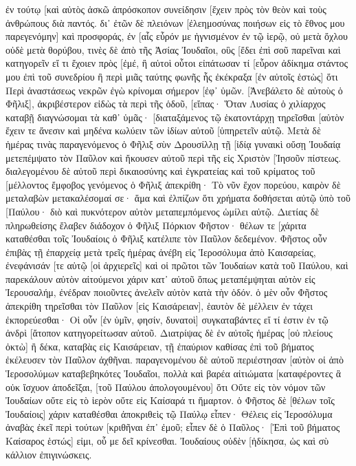 ἐν τούτῳ [καὶ αὐτὸς ἀσκῶ ἀπρόσκοπον συνείδησιν [ἔχειν πρὸς τὸν θεὸν καὶ τοὺς ἀνθρώπους διὰ παντός. 
δι᾽ ἐτῶν δὲ πλειόνων [ἐλεημοσύνας ποιήσων εἰς τὸ ἔθνος μου παρεγενόμην] καὶ προσφοράς, 
ἐν [αἷς εὗρόν με ἡγνισμένον ἐν τῷ ἱερῷ, οὐ μετὰ ὄχλου οὐδὲ μετὰ θορύβου, 
τινὲς δὲ ἀπὸ τῆς Ἀσίας Ἰουδαῖοι, οὓς [ἔδει ἐπὶ σοῦ παρεῖναι καὶ κατηγορεῖν εἴ τι ἔχοιεν πρὸς [ἐμέ, 
ἢ αὐτοὶ οὗτοι εἰπάτωσαν τί [εὗρον ἀδίκημα στάντος μου ἐπὶ τοῦ συνεδρίου 
ἢ περὶ μιᾶς ταύτης φωνῆς ἧς ἐκέκραξα [ἐν αὐτοῖς ἑστὼς] ὅτι Περὶ ἀναστάσεως νεκρῶν ἐγὼ κρίνομαι σήμερον [ἐφ᾽ ὑμῶν. 
[Ἀνεβάλετο δὲ αὐτοὺς ὁ Φῆλιξ], ἀκριβέστερον εἰδὼς τὰ περὶ τῆς ὁδοῦ, [εἴπας· Ὅταν Λυσίας ὁ χιλίαρχος καταβῇ διαγνώσομαι τὰ καθ᾽ ὑμᾶς· 
[διαταξάμενος τῷ ἑκατοντάρχῃ τηρεῖσθαι [αὐτὸν ἔχειν τε ἄνεσιν καὶ μηδένα κωλύειν τῶν ἰδίων αὐτοῦ [ὑπηρετεῖν αὐτῷ. 
Μετὰ δὲ ἡμέρας τινὰς παραγενόμενος ὁ Φῆλιξ σὺν Δρουσίλλῃ τῇ [ἰδίᾳ γυναικὶ οὔσῃ Ἰουδαίᾳ μετεπέμψατο τὸν Παῦλον καὶ ἤκουσεν αὐτοῦ περὶ τῆς εἰς Χριστὸν [Ἰησοῦν πίστεως. 
διαλεγομένου δὲ αὐτοῦ περὶ δικαιοσύνης καὶ ἐγκρατείας καὶ τοῦ κρίματος τοῦ [μέλλοντος ἔμφοβος γενόμενος ὁ Φῆλιξ ἀπεκρίθη· Τὸ νῦν ἔχον πορεύου, καιρὸν δὲ μεταλαβὼν μετακαλέσομαί σε· 
ἅμα καὶ ἐλπίζων ὅτι χρήματα δοθήσεται αὐτῷ ὑπὸ τοῦ [Παύλου· διὸ καὶ πυκνότερον αὐτὸν μεταπεμπόμενος ὡμίλει αὐτῷ. 
Διετίας δὲ πληρωθείσης ἔλαβεν διάδοχον ὁ Φῆλιξ Πόρκιον Φῆστον· θέλων τε [χάριτα καταθέσθαι τοῖς Ἰουδαίοις ὁ Φῆλιξ κατέλιπε τὸν Παῦλον δεδεμένον. 
Φῆστος οὖν ἐπιβὰς τῇ ἐπαρχείᾳ μετὰ τρεῖς ἡμέρας ἀνέβη εἰς Ἱεροσόλυμα ἀπὸ Καισαρείας, 
ἐνεφάνισάν [τε αὐτῷ [οἱ ἀρχιερεῖς] καὶ οἱ πρῶτοι τῶν Ἰουδαίων κατὰ τοῦ Παύλου, καὶ παρεκάλουν αὐτὸν 
αἰτούμενοι χάριν κατ᾽ αὐτοῦ ὅπως μεταπέμψηται αὐτὸν εἰς Ἰερουσαλήμ, ἐνέδραν ποιοῦντες ἀνελεῖν αὐτὸν κατὰ τὴν ὁδόν. 
ὁ μὲν οὖν Φῆστος ἀπεκρίθη τηρεῖσθαι τὸν Παῦλον [εἰς Καισάρειαν], ἑαυτὸν δὲ μέλλειν ἐν τάχει ἐκπορεύεσθαι· 
Οἱ οὖν [ἐν ὑμῖν, φησίν, δυνατοὶ] συγκαταβάντες εἴ τί ἐστιν ἐν τῷ ἀνδρὶ [ἄτοπον κατηγορείτωσαν αὐτοῦ. 
Διατρίψας δὲ ἐν αὐτοῖς ἡμέρας [οὐ πλείους ὀκτὼ] ἢ δέκα, καταβὰς εἰς Καισάρειαν, τῇ ἐπαύριον καθίσας ἐπὶ τοῦ βήματος ἐκέλευσεν τὸν Παῦλον ἀχθῆναι. 
παραγενομένου δὲ αὐτοῦ περιέστησαν [αὐτὸν οἱ ἀπὸ Ἱεροσολύμων καταβεβηκότες Ἰουδαῖοι, πολλὰ καὶ βαρέα αἰτιώματα [καταφέροντες ἃ οὐκ ἴσχυον ἀποδεῖξαι, 
[τοῦ Παύλου ἀπολογουμένου] ὅτι Οὔτε εἰς τὸν νόμον τῶν Ἰουδαίων οὔτε εἰς τὸ ἱερὸν οὔτε εἰς Καίσαρά τι ἥμαρτον. 
ὁ Φῆστος δὲ [θέλων τοῖς Ἰουδαίοις] χάριν καταθέσθαι ἀποκριθεὶς τῷ Παύλῳ εἶπεν· Θέλεις εἰς Ἱεροσόλυμα ἀναβὰς ἐκεῖ περὶ τούτων [κριθῆναι ἐπ᾽ ἐμοῦ; 
εἶπεν δὲ ὁ Παῦλος· [Ἐπὶ τοῦ βήματος Καίσαρος ἑστώς] εἰμι, οὗ με δεῖ κρίνεσθαι. Ἰουδαίους οὐδὲν [ἠδίκησα, ὡς καὶ σὺ κάλλιον ἐπιγινώσκεις. 
